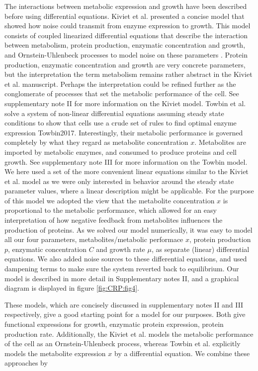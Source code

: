 The interactions between metabolic expression and growth have been described before using differential equations.
%
Kiviet et al. presented a concise model that showed how noise could transmit from enzyme expression to growth.
This model consists of coupled linearized differential equations that describe the interaction between metabolism, protein production, enzymatic concentration and growth,
and Ornstein-Uhlenbeck processes to model noise on these parameters \cite{Kiviet2014}.
Protein production, enzymatic concentration and growth are very concrete parameters, 
but the interpretation the term metabolism remains rather abstract in the Kiviet et al. manuscript. 
Perhaps the interpretation could be refined further as the conglomerate of processes that set the metabolic performance of the cell.
See supplementary note II for more information on the Kiviet model.
%
Towbin et al. solve a system of non-linear differential equations assuming steady state conditions to show that cells use a crude set of rules to find optimal enzyme expression {Towbin2017}.
Interestingly, their metabolic performance is governed completely by what they regard as metabolite concentration $x$.
Metabolites are imported by metabolic enzymes, and consumed to produce proteins and cell growth.
See supplementary note III for more information on the Towbin model. 
%
We here used a set of the more convenient linear equations similar to the Kiviet et al. model as we were only interested in behavior around the steady state parameter values, where a linear description might be applicable.
For the purpose of this model we adopted the view that the metabolite concentration $x$ is proportional to the metabolic performance, 
which allowed for an easy interpretation of how negative feedback from metabolites influences the production of proteins.
%
As we solved our model numerically, it was easy to model all our four parameters, metabolites/metabolic performace $x$, protein production $p$, enzymatic concentration $C$ and growth rate $\mu$, as separate (linear) differential equations.
%
We also added noise sources to these differential equations, and used dampening terms to make sure the system reverted back to equilibrium.
%
Our model is described in more detail in Supplementary notes II, and a graphical diagram is displayed in figure \ref{fig:CRP:fig4}.









%
These models, which are concisely discussed in supplementary notes II and III respectively, give a good starting point for a model for our purposes.
%
Both give functional expressions for growth, enzymatic protein expression, protein production rate. 
%
Additionally, the Kiviet et al. models the metabolic performance of the cell as an Ornstein-Uhlenbeck process,
whereas Towbin et al. explicitly models the metabolite expression $x$ by a differential equation.
%
We combine these approaches by 

